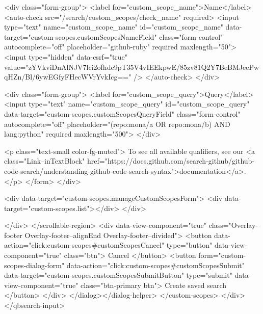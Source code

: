           <div class="form-group">
            <label for="custom_scope_name">Name</label>
            <auto-check src="/search/custom_scopes/check_name" required>
              <input
                type="text"
                name="custom_scope_name"
                id="custom_scope_name"
                data-target="custom-scopes.customScopesNameField"
                class="form-control"
                autocomplete="off"
                placeholder="github-ruby"
                required
                maxlength="50">
              <input type="hidden" data-csrf="true" value="zYVkviDnAlNJV7lci2ofhdc9pT35V4vIEEkpwE/85zv81Q2Y7BeBMJeePwqHZn/Bl/6ywEGfyFHecWVrYvkIcg==" />
            </auto-check>
          </div>

          <div class="form-group">
            <label for="custom_scope_query">Query</label>
            <input
              type="text"
              name="custom_scope_query"
              id="custom_scope_query"
              data-target="custom-scopes.customScopesQueryField"
              class="form-control"
              autocomplete="off"
              placeholder="(repo:mona/a OR repo:mona/b) AND lang:python"
              required
              maxlength="500">
          </div>

          <p class="text-small color-fg-muted">
            To see all available qualifiers, see our <a class="Link--inTextBlock" href="https://docs.github.com/search-github/github-code-search/understanding-github-code-search-syntax">documentation</a>.
          </p>
</form>        </div>

        <div data-target="custom-scopes.manageCustomScopesForm">
          <div data-target="custom-scopes.list"></div>
        </div>

</div>
      </scrollable-region>
      <div data-view-component="true" class="Overlay-footer Overlay-footer--alignEnd Overlay-footer--divided">          <button data-action="click:custom-scopes#customScopesCancel" type="button" data-view-component="true" class="btn">    Cancel
</button>
          <button form="custom-scopes-dialog-form" data-action="click:custom-scopes#customScopesSubmit" data-target="custom-scopes.customScopesSubmitButton" type="submit" data-view-component="true" class="btn-primary btn">    Create saved search
</button>
</div>
</dialog></dialog-helper>
    </custom-scopes>
  </div>
</qbsearch-input>



